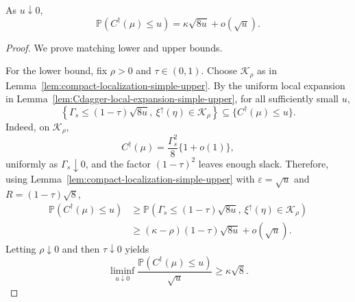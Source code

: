 \documentclass[10pt]{article}
\theoremstyle{plain}
\begin{document}
\begin{lemma}
\label{lem:Cdagger-tail-simple-upper}
As \(u\downarrow0\),
\[
    \mathbb P(C^\dagger(\mu)\le u)
    =
    \kappa\sqrt{8u}+o(\sqrt u).
\]
\end{lemma}

\begin{proof}
We prove matching lower and upper bounds.

For the lower bound, fix \(\rho>0\) and \(\tau\in(0,1)\).  Choose
\(\mathcal K_\rho\) as in
Lemma~\ref{lem:compact-localization-simple-upper}.  By the uniform local
expansion in Lemma~\ref{lem:Cdagger-local-expansion-simple-upper}, for all
sufficiently small \(u\),
\[
    \left\{
        \Gamma_s\le (1-\tau)\sqrt{8u},
        \ \xi^\uparrow(\eta)\in\mathcal K_\rho
    \right\}
    \subseteq
    \{C^\dagger(\mu)\le u\}.
\]
Indeed, on \(\mathcal K_\rho\),
\[
    C^\dagger(\mu)
    =
    \frac{\Gamma_s^2}{8}\{1+o(1)\},
\]
uniformly as \(\Gamma_s\downarrow0\), and the factor
\((1-\tau)^2\) leaves enough slack.  Therefore, using
Lemma~\ref{lem:compact-localization-simple-upper} with
\(\varepsilon=\sqrt u\) and \(R=(1-\tau)\sqrt8\),
\[
\begin{aligned}
    \mathbb P(C^\dagger(\mu)\le u)
    &\ge
    \mathbb P\left(
        \Gamma_s\le (1-\tau)\sqrt{8u},
        \ \xi^\uparrow(\eta)\in\mathcal K_\rho
    \right)  \\
    &\ge
    (\kappa-\rho)(1-\tau)\sqrt{8u}
    +
    o(\sqrt u).
\end{aligned}
\]
Letting \(\rho\downarrow0\) and then \(\tau\downarrow0\) yields
\[
    \liminf_{u\downarrow0}
    \frac{\mathbb P(C^\dagger(\mu)\le u)}{\sqrt u}
    \ge
    \kappa\sqrt8.
\]


\end{proof}
\end{document}
